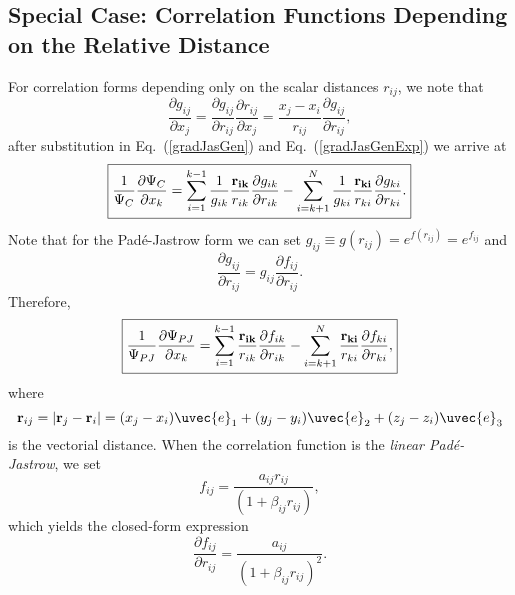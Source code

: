 \subsection{Special Case: Correlation Functions Depending on the Relative Distance}
For correlation forms depending only on the scalar distances $r_{ij}$, we note that
\begin{equation}\label{chainRule}
\frac{\partial g_{ij}}{\partial x_j} = \frac{\partial g_{ij}}{\partial r_{ij}} \frac{\partial r_{ij}}{\partial x_j} = \frac{x_j - x_i}{r_{ij}} \frac{\partial g_{ij}}{\partial r_{ij}},
\end{equation}
after substitution in Eq.~(\ref{gradJasGen}) and Eq.~(\ref{gradJasGenExp}) we arrive at
\begin{equation}\label{generalCorrelation}
\boxed{
\frac{1}{\Psi_C}\frac{\partial \Psi_C}{\partial x_k} = 
\sum_{i=1}^{k-1}\frac{1}{g_{ik}} \frac{{\bf r_{ik}}}{r_{ik}} \frac{\partial g_{ik}}{\partial r_{ik}}
-
\sum_{i=k+1}^{N}\frac{1}{g_{ki}}\frac{{\bf r_{ki}}}{r_{ki}}\frac{\partial g_{ki}}{\partial r_{ki}}.
}
\end{equation}
Note that for the Pad\'e-Jastrow form we can set $g_{ij} \equiv g(r_{ij}) = e^{f(r_{ij})} = e^{f_{ij}}$ and 
\begin{equation}
\frac{\partial g_{ij}}{\partial r_{ij}} = g_{ij} \frac{\partial f_{ij}}{\partial r_{ij}}.
\end{equation}
Therefore, 
\begin{equation}\label{padeJastrowGradJasRatio}
\boxed{
\frac{1}{\Psi_{PJ}}\frac{\partial \Psi_{PJ}}{\partial x_k} =
\sum_{i=1}^{k-1}\frac{{\bf r_{ik}}}{r_{ik}}\frac{\partial f_{ik}}{\partial r_{ik}}
-
\sum_{i=k+1}^{N}\frac{{\bf r_{ki}}}{r_{ki}}\frac{\partial f_{ki}}{\partial r_{ki}},
}
\end{equation}
where 
\begin{equation}\label{distanceVector}
 {\bf r}_{ij} = |{\bf r}_j - {\bf r}_i| = (x_j - x_i)\uvec{e}_1 + (y_j - y_i)\uvec{e}_2 + (z_j - z_i)\uvec{e}_3
\end{equation}
is the vectorial distance. When the correlation function is the \emph{linear Pad\'e-Jastrow}, we set \begin{equation}
f_{ij} = \frac{a_{ij} r_{ij}}{(1 + \beta_{ij} r_{ij})},
\end{equation}
which yields the closed-form expression
\begin{equation}\label{analyticalPJGrad}
 \boxed{\frac{\partial f_{ij}}{\partial r_{ij}} = \frac{a_{ij}}{(1 + \beta_{ij} r_{ij})^2}}.
\end{equation}



